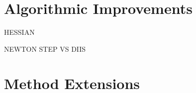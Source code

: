 \section{Algorithmic Improvements}
%
%

HESSIAN

NEWTON STEP VS DIIS

\section{Method Extensions}
%
%

